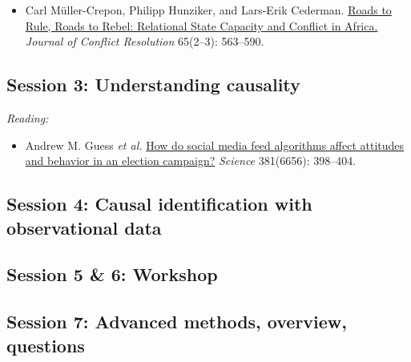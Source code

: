 \documentclass[12pt, a4paper]{article}
\begin{document}
\begin{itemize}
  \item Carl Müller-Crepon, Philipp Hunziker, and Lars-Erik Cederman. \href{https://journals.sagepub.com/doi/10.1177/0022002720963674}{Roads to Rule, Roads to Rebel: Relational State Capacity and Conflict in Africa.} \textit{Journal of Conflict Resolution} 65(2--3): 563--590.
\end{itemize}

\subsection*{Session 3: Understanding causality}


\textit{Reading:}

\begin{itemize}
  \item Andrew M. Guess \textit{et al.} \href{https://www.science.org/doi/10.1126/science.abp9364}{How do social media feed algorithms affect attitudes and behavior in an election campaign?} \textit{Science} 381(6656): 398--404.
\end{itemize}


\subsection*{Session 4: Causal identification with observational data}


\subsection*{Session 5 \& 6: Workshop}


\subsection*{Session 7: Advanced methods, overview, questions}
\end{document}
